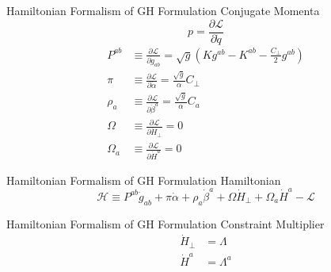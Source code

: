 \documentclass[xcolor=dvipsnames]{beamer}
\begin{document}
	\begin{frame}{Hamiltonian Formalism of GH Formulation}
		Conjugate Momenta
		\[
		p = \frac{\partial \mathscr{L}}{\partial {\dot q}}
		\]
		\pause
		\begin{align*}
			P^{ab} & \equiv \frac{\partial \mathscr{L}}{\partial {\dot g}_{ab}} = \sqrt{g}\left(Kg^{ab} - K^{ab} - \frac{C_{\perp}}{2}g^{ab}\right)\\
				\pi & \equiv \frac{\partial \mathscr{L}}{\partial {\dot \alpha}} = \frac{\sqrt{g}}{\alpha}C_{\perp}\\
				\rho_{a} & \equiv \frac{\partial \mathscr{L}}{\partial {\dot \beta}^{a}} = \frac{\sqrt{g}}{\alpha}C_{a}\\
				\Omega & \equiv \frac{\partial \mathscr{L}}{\partial {\dot H}_{\perp}} = 0\\
				\Omega_{a} & \equiv \frac{\partial \mathscr{L}}{\partial {\dot H}^{a}} = 0	
		\end{align*}
	\end{frame}
	\begin{frame}{Hamiltonian Formalism of GH Formulation}
		Hamiltonian
		\[
		\mathscr{H} \equiv P^{ab}{\dot g}_{ab} + \pi{\dot \alpha} + \rho_{a}{\dot \beta}^{a} + \Omega {\dot H}_{\perp} + \Omega_{a}{\dot H}^{a} - \mathscr{L}
		\]
	\end{frame}
	\begin{frame}{Hamiltonian Formalism of GH Formulation}
		Constraint Multiplier
		\begin{align*}
		{\dot H}_{\perp} & = \Lambda\\
		{\dot H}^{a} & = \Lambda^{a}
	\end{align*}
	\end{frame}
\end{document}
